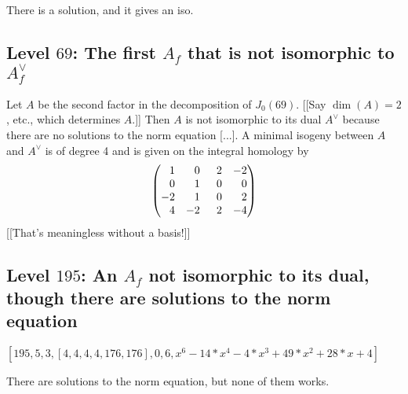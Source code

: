 \documentclass{article}
\begin{document}
There is a solution, and it gives an iso.

\subsection{Level $69$: The first $A_f$ that is not
isomorphic to $A_f^{\vee}$}


Let $A$ be the second factor in the decomposition of $J_0(69)$.
[[Say $\dim(A) = 2$, etc., which determines $A$.]]
Then $A$ is
not isomorphic to its dual $A^\vee$ because there are no solutions to the norm
equation [...].
A minimal isogeny between $A$ and $A^\vee$ is of degree 4 and is given on the integral
homology by
\[ \left( \begin{matrix}
            \hfill 1 & \hfill 0 & \hfill 2         & -2        \\
            \hfill 0 & \hfill 1 & \hfill 0         & \hfill 0  \\
            -2       & \hfill 1 & \hfill  0        & \hfill  2 \\
\hfill 4 & -2       & \hspace{1.2ex} 2 & -4\end{matrix} \right)\]
[[That's meaningless without a basis!]]


\subsection{Level $195$: An $A_f$ not isomorphic to
its dual, though there are solutions to the norm equation}

$[195, 5, 3, [ 4, 4, 4, 4, 176, 176 ], 0, 6, x^6 - 14*x^4 - 4*x^3 + 49*x^2 +
28*x + 4] $

There are solutions to the norm equation, but none of them works.


\end{document}
